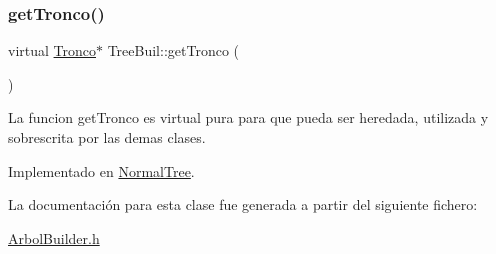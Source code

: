 \subsubsection{\texorpdfstring{get\+Tronco()}{getTronco()}}
{\footnotesize\ttfamily virtual \hyperlink{classTronco}{Tronco}$\ast$ Tree\+Buil\+::get\+Tronco (\begin{DoxyParamCaption}{ }\end{DoxyParamCaption})\hspace{0.3cm}{\ttfamily [pure virtual]}}

La funcion get\+Tronco es virtual pura para que pueda ser heredada, utilizada y sobrescrita por las demas clases. 

Implementado en \hyperlink{classNormalTree_a95dcc1035a23a0142ace79e5f994e85a}{Normal\+Tree}.



La documentación para esta clase fue generada a partir del siguiente fichero\+:\begin{DoxyCompactItemize}
\item 
\hyperlink{ArbolBuilder_8h}{Arbol\+Builder.\+h}\end{DoxyCompactItemize}
